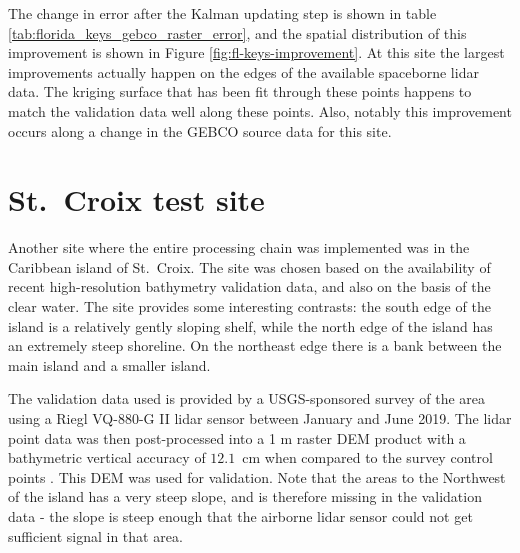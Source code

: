 The change in error after the Kalman updating step is shown in table \ref{tab:florida_keys_gebco_raster_error}, and the spatial distribution of this improvement is shown in Figure \ref{fig:fl-keys-improvement}. At this site the largest improvements actually happen on the edges of the available spaceborne lidar data. The kriging surface that has been fit through these points happens to match the validation data well along these points. Also, notably this improvement occurs along a change in the GEBCO source data for this site.

\begin{figure}[!ht]
    \begin{floatrow}
    \end{floatrow}
\end{figure}

\section{St.~Croix test site} \label{sec:stcroix-site}

Another site where the entire processing chain was implemented was in the Caribbean island of St.~Croix. The site was chosen based on the availability of recent high-resolution bathymetry validation data, and also on the basis of the clear water. The site provides some interesting contrasts: the south edge of the island is a relatively gently sloping shelf, while the north edge of the island has an extremely steep shoreline. On the northeast edge there is a bank between the main island and a smaller island.

The validation data used is provided by a USGS-sponsored survey of the area using a Riegl VQ-880-G II lidar sensor between January and June 2019. The lidar point data was then post-processed into a 1 m raster DEM product with a bathymetric vertical accuracy of $12.1$~cm when compared to the survey control points \parencite{USVI-lidar2022}. This DEM was used for validation. Note that the areas to the Northwest of the island has a very steep slope, and is therefore missing in the validation data - the slope is steep enough that the airborne lidar sensor could not get sufficient signal in that area.

